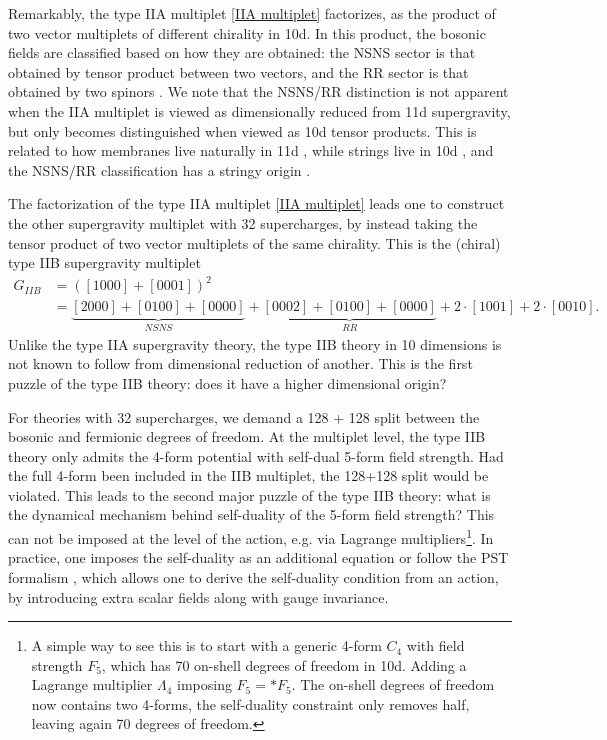 Remarkably, the type IIA multiplet \eqref{IIA multiplet} factorizes, as the product of two vector multiplets of different chirality in 10d.
In this product, the bosonic fields are classified based on how they are obtained: the NSNS sector is that obtained by tensor product between two vectors, and the RR sector is that obtained by two spinors \cite{Polchinski:1998rr}.
We note that the NSNS/RR distinction is not apparent when the IIA multiplet is viewed as dimensionally reduced from 11d supergravity, but only becomes distinguished when viewed as 10d tensor products.
This is related to how membranes live naturally in 11d \cite{Bergshoeff:1987cm}, while strings live in 10d \cite{Green:2012oqa}, and the NSNS/RR classification has a stringy origin \cite{Polchinski:1995mt}.

The factorization of the type IIA multiplet \eqref{IIA multiplet} leads one to construct the other supergravity multiplet with 32 supercharges, by instead taking the tensor product of two vector multiplets of the same chirality. This is the (chiral) type IIB supergravity multiplet
\begin{equation}
\begin{aligned}
G_{IIB}
&=\left([1000] + [0001]\right)^2\\
&=\underbrace{[2000]+[0100] + [0000]}_{NSNS} 
+ \underbrace{[0002] + [0100] + [0000]}_{RR} + 2\cdot[1001] + 2\cdot[0010].
\end{aligned}
\end{equation}
Unlike the type IIA supergravity theory, the type IIB theory in 10 dimensions is not known to follow from dimensional reduction of another.
This is the first puzzle of the type IIB theory: does it have a higher dimensional origin?

For theories with 32 supercharges, we demand a 128 + 128 split between the bosonic and fermionic degrees of freedom.
At the multiplet level, the type IIB theory only admits the 4-form potential with self-dual 5-form field strength.
Had the full 4-form been included in the IIB multiplet, the 128+128 split would be violated.
This leads to the second major puzzle of the type IIB theory: 
what is the dynamical mechanism behind self-duality of the 5-form field strength?
This can not be imposed at the level of the action, e.g. via Lagrange multipliers\footnote{
A simple way to see this is to start with a generic 4-form $C_4$ with field strength $F_5$, which has 70 on-shell degrees of freedom in 10d.
Adding a Lagrange multiplier $\Lambda_4$ imposing $F_5 = * F_5$.
The on-shell degrees of freedom now contains two 4-forms, the self-duality constraint only removes half, leaving again 70 degrees of freedom.
}. 
In practice, one imposes the self-duality as an additional equation or follow the PST formalism \cite{Pasti:1996vs, DallAgata:1997gnw, DallAgata:1998ahf}, which allows one to derive the self-duality condition from an action, by introducing extra scalar fields along with gauge invariance.

